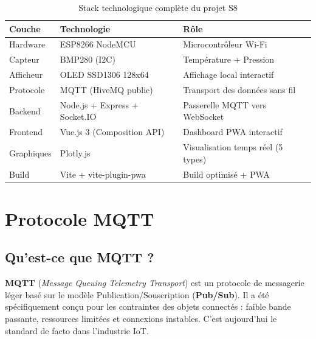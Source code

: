 \documentclass[12pt, a4paper]{report}
\begin{document}
\begin{table}[H]
\centering
\renewcommand{\arraystretch}{1.4}
\begin{tabularx}{\linewidth}{|l|l|X|}
\hline
\rowcolor{bleuFonce!10}
\textbf{Couche} & \textbf{Technologie} & \textbf{R\^ole} \\
\hline
Hardware   & ESP8266 NodeMCU          & Microcontr\^oleur Wi-Fi \\
\hline
Capteur    & BMP280 (I2C)             & Temp\'erature + Pression \\
\hline
Afficheur  & OLED SSD1306 128x64      & Affichage local interactif \\
\hline
Protocole  & MQTT (HiveMQ public)     & Transport des donn\'ees sans fil \\
\hline
Backend    & Node.js + Express + Socket.IO & Passerelle MQTT vers WebSocket \\
\hline
Frontend   & Vue.js 3 (Composition API) & Dashboard PWA interactif \\
\hline
Graphiques & Plotly.js                & Visualisation temps r\'eel (5 types) \\
\hline
Build      & Vite + vite-plugin-pwa   & Build optimis\'e + PWA \\
\hline
\end{tabularx}
\caption{Stack technologique compl\`ete du projet S8}
\label{tab:stack}
\end{table}

\section{Protocole MQTT}

\subsection{Qu'est-ce que MQTT ?}

\textbf{MQTT} (\textit{Message Queuing Telemetry Transport}) est un
protocole de messagerie l\'eger bas\'e sur le mod\`ele
Publication/Souscription (\textbf{Pub/Sub}). Il a \'et\'e sp\'ecifiquement con\c{c}u pour les contraintes
des objets connect\'es : faible bande passante, ressources limit\'ees
et connexions instables. C'est aujourd'hui le standard de facto
dans l'industrie IoT.
\end{document}

